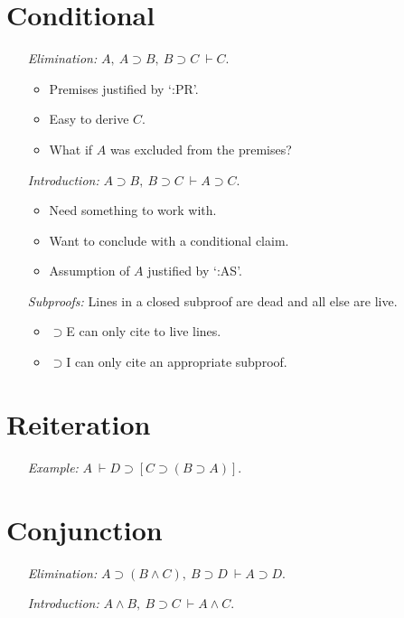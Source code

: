 \documentclass[a4paper, 11pt]{article} %
\begin{document}
\section*{Conditional}

\begin{enumerate}
  \item[\it Elimination:] $A,\ A \supset B,\ B \supset C\ \vdash C$. 
    \begin{itemize}
      \item Premises justified by `:PR'.
      \item Easy to derive $C$.
      \item What if $A$ was excluded from the premises? 
    \end{itemize}
  \item[\it Introduction:] $A \supset B,\ B \supset C\ \vdash A \supset C$. 
    \begin{itemize}
      \item Need something to work with.
      \item Want to conclude with a conditional claim.
      \item Assumption of $A$ justified by `:AS'.
    \end{itemize}
  \item[\it Subproofs:] Lines in a closed subproof are dead and all else are live.
    \begin{itemize}
      \item $\supset$E can only cite to live lines.
      \item $\supset$I can only cite an appropriate subproof.
    \end{itemize}
\end{enumerate}




\section*{Reiteration}

\begin{enumerate}
  \item[\it Example:] $A\ \vdash D \supset [C \supset (B \supset A)]$.
\end{enumerate}




\section*{Conjunction}

\begin{enumerate}
  \item[\it Elimination:] $A \supset (B\wedge C),\ B \supset D\ \vdash A \supset D$.
  \item[\it Introduction:] $A \wedge B,\ B \supset C\ \vdash A \wedge C$.
\end{enumerate}
\end{document}
